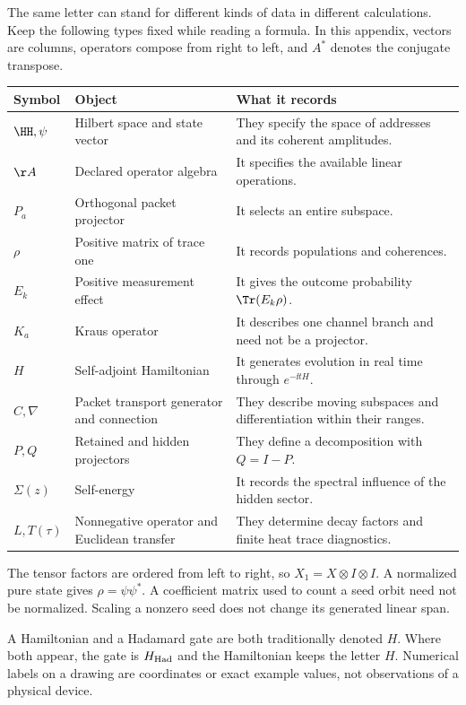 The same letter can stand for different kinds of data in different calculations. Keep the following types fixed while reading a formula. In this appendix, vectors are columns, operators compose from right to left, and $A^*$ denotes the conjugate transpose.
\par\vspace{4pt}
\begin{tabularx}{\linewidth}{@{}p{.13\linewidth}YY@{}}
\toprule
Symbol & Object & What it records\\\midrule
$\HH,\psi$ & Hilbert space and state vector & They specify the space of addresses and its coherent amplitudes.\\
$\AA$ & Declared operator algebra & It specifies the available linear operations.\\
$P_a$ & Orthogonal packet projector & It selects an entire subspace.\\
$\rho$ & Positive matrix of trace one & It records populations and coherences.\\
$E_k$ & Positive measurement effect & It gives the outcome probability $\Tr(E_k\rho)$.\\
$K_a$ & Kraus operator & It describes one channel branch and need not be a projector.\\
$H$ & Self-adjoint Hamiltonian & It generates evolution in real time through $e^{-\ii tH}$.\\
$C,\nabla$ & Packet transport generator and connection & They describe moving subspaces and differentiation within their ranges.\\
$P,Q$ & Retained and hidden projectors & They define a decomposition with $Q=I-P$.\\
$\Sigma(z)$ & Self-energy & It records the spectral influence of the hidden sector.\\
$L,T(\tau)$ & Nonnegative operator and Euclidean transfer & They determine decay factors and finite heat trace diagnostics.\\\bottomrule
\end{tabularx}
The tensor factors are ordered from left to right, so $X_1=X\otimes I\otimes I$. A normalized pure state gives $\rho=\psi\psi^*$. A coefficient matrix used to count a seed orbit need not be normalized. Scaling a nonzero seed does not change its generated linear span.

A Hamiltonian and a Hadamard gate are both traditionally denoted $H$. Where both appear, the gate is $H_{\rm Had}$ and the Hamiltonian keeps the letter $H$. Numerical labels on a drawing are coordinates or exact example values, not observations of a physical device.

